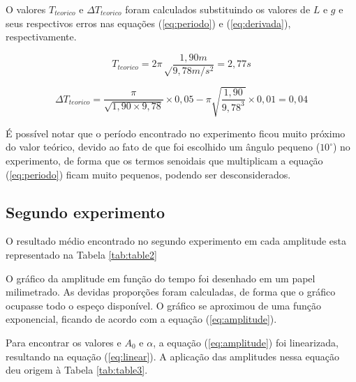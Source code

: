 \documentclass[10pt]{article}
\begin{document}
O valores $T_{teorico}$ e $\Delta T_{teorico}$ foram calculados substituindo os valores de $L$ e $g$ e seus respectivos erros nas equações (\ref{eq:periodo}) e (\ref{eq:derivada}), respectivamente. 

\begin{equation}
	T_{teorico} = 2\pi\sqrt\frac{1,90m}{9,78m/s^2} = 2,77s
\end{equation}

\begin{equation}
\Delta T_{teorico} = \frac{\pi}{\sqrt{ 1,90\times9,78}}\times 0,05 - \pi \sqrt{ \frac{1,90}{9,78^3}} \times 0,01 = 0,04
\end{equation}

É possível notar que o período encontrado no experimento ficou muito próximo do valor teórico, devido ao fato de que foi escolhido um ângulo pequeno ($10^\circ$) no experimento, de forma que os termos senoidais que multiplicam a equação (\ref{eq:periodo}) ficam muito pequenos, podendo ser desconsiderados.

\subsection{Segundo experimento}
O resultado médio encontrado no segundo experimento em cada amplitude esta representado na Tabela \ref{tab:table2}

\begin{table}[ht]
	\begin{center}
		\caption{Tempo médio em cada amplitude}
		\label{tab:table2}
	\end{center}
\end{table}

O gráfico da amplitude em função do tempo foi desenhado em um papel milimetrado. As devidas proporções foram calculadas, de forma que o gráfico ocupasse todo o espeço disponível. O gráfico se aproximou de uma função exponencial, ficando de acordo com a equação (\ref{eq:amplitude}).

Para encontrar os valores e $A_0$ e $\alpha$, a equação (\ref{eq:amplitude}) foi linearizada, resultando na equação (\ref{eq:linear}). A aplicação das amplitudes nessa equação deu origem à Tabela \ref{tab:table3}.
\end{document}
